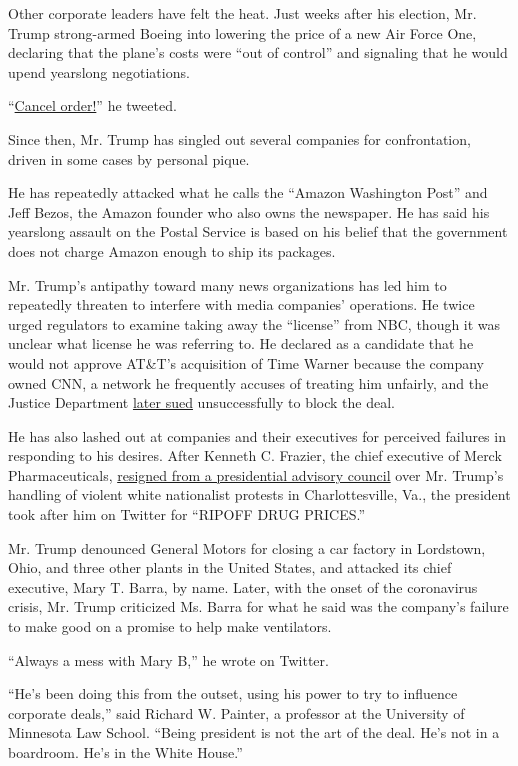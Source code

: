 Other corporate leaders have felt the heat. Just weeks after his
election, Mr. Trump strong-armed Boeing into lowering the price of a new
Air Force One, declaring that the plane's costs were ``out of control''
and signaling that he would upend yearslong negotiations.

``\href{https://www.nytimes.com/2016/12/06/us/politics/trump-air-force-one-boeing.html}{Cancel
order!}'' he tweeted.

Since then, Mr. Trump has singled out several companies for
confrontation, driven in some cases by personal pique.

He has repeatedly attacked what he calls the ``Amazon Washington Post''
and Jeff Bezos, the Amazon founder who also owns the newspaper. He has
said his yearslong assault on the Postal Service is based on his belief
that the government does not charge Amazon enough to ship its packages.

Mr. Trump's antipathy toward many news organizations has led him to
repeatedly threaten to interfere with media companies' operations. He
twice urged regulators to examine taking away the ``license'' from NBC,
though it was unclear what license he was referring to. He declared as a
candidate that he would not approve AT\&T's acquisition of Time Warner
because the company owned CNN, a network he frequently accuses of
treating him unfairly, and the Justice Department
\href{https://www.nytimes.com/2017/11/20/business/dealbook/att-time-warner-merger.html}{later
sued} unsuccessfully to block the deal.

He has also lashed out at companies and their executives for perceived
failures in responding to his desires. After Kenneth C. Frazier, the
chief executive of Merck Pharmaceuticals,
\href{https://www.nytimes.com/2017/08/14/business/merck-trump-ceos.html}{resigned
from a presidential advisory council} over Mr. Trump's handling of
violent white nationalist protests in Charlottesville, Va., the
president took after him on Twitter for ``RIPOFF DRUG PRICES.''

Mr. Trump denounced General Motors for closing a car factory in
Lordstown, Ohio, and three other plants in the United States, and
attacked its chief executive, Mary T. Barra, by name. Later, with the
onset of the coronavirus crisis, Mr. Trump criticized Ms. Barra for what
he said was the company's failure to make good on a promise to help make
ventilators.

``Always a mess with Mary B,'' he wrote on Twitter.

``He's been doing this from the outset, using his power to try to
influence corporate deals,'' said Richard W. Painter, a professor at the
University of Minnesota Law School. ``Being president is not the art of
the deal. He's not in a boardroom. He's in the White House.''

